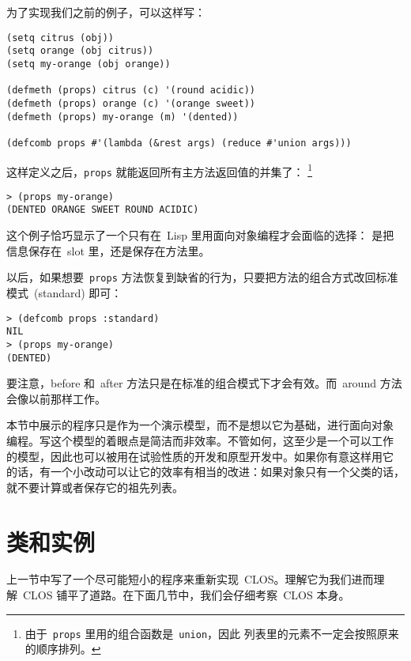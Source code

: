 为了实现我们之前的例子，可以这样写：
\begin{lstlisting}
(setq citrus (obj))
(setq orange (obj citrus))
(setq my-orange (obj orange))

(defmeth (props) citrus (c) '(round acidic))
(defmeth (props) orange (c) '(orange sweet))
(defmeth (props) my-orange (m) '(dented))

(defcomb props #'(lambda (&rest args) (reduce #'union args)))
\end{lstlisting}
这样定义之后，\texttt{props} 就能返回所有主方法返回值的并集了：
\footnote{由于~\texttt{props} 里用的组合函数是~\texttt{union}，因此
列表里的元素不一定会按照原来的顺序排列。}

\begin{lstlisting}
> (props my-orange)
(DENTED ORANGE SWEET ROUND ACIDIC)
\end{lstlisting}

这个例子恰巧显示了一个只有在~Lisp 里用面向对象编程才会面临的选择：
是把信息保存在~slot 里，还是保存在方法里。

以后，如果想要~\texttt{props} 方法恢复到缺省的行为，只要把方法的组合方式改回标准模式~(standard) 即可：
\begin{lstlisting}
> (defcomb props :standard)
NIL
> (props my-orange)
(DENTED)
\end{lstlisting}
要注意，before 和~after 方法只是在标准的组合模式下才会有效。而~around
方法会像以前那样工作。

本节中展示的程序只是作为一个演示模型，而不是想以它为基础，进行面向对象
编程。写这个模型的着眼点是简洁而非效率。不管如何，这至少是一个可以工作
的模型，因此也可以被用在试验性质的开发和原型开发中。如果你有意这样用它
的话，有一个小改动可以让它的效率有相当的改进：如果对象只有一个父类的话，
就不要计算或者保存它的祖先列表。

\section{类和实例}
\label{sec:classes_and_instances}

上一节中写了一个尽可能短小的程序来重新实现~CLOS。理解它为我们进而理
解~CLOS 铺平了道路。在下面几节中，我们会仔细考察~CLOS 本身。

